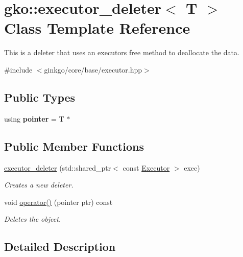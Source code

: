 \hypertarget{classgko_1_1executor__deleter}{}\section{gko\+:\+:executor\+\_\+deleter$<$ T $>$ Class Template Reference}
\label{classgko_1_1executor__deleter}


This is a deleter that uses an executor\textquotesingle{}s {\ttfamily free} method to deallocate the data.  




{\ttfamily \#include $<$ginkgo/core/base/executor.\+hpp$>$}

\subsection*{Public Types}
\begin{DoxyCompactItemize}
\item 
\mbox{\label{classgko_1_1executor__deleter_aeaea90789ef7502ffa1a4caa28561f50}} 
using {\bfseries pointer} = T $\ast$
\end{DoxyCompactItemize}
\subsection*{Public Member Functions}
\begin{DoxyCompactItemize}
\item 
\hyperlink{classgko_1_1executor__deleter_a260f79ed87560fefc48d52b072bbb776}{executor\+\_\+deleter} (std\+::shared\+\_\+ptr$<$ const \hyperlink{classgko_1_1Executor}{Executor} $>$ exec)
\begin{DoxyCompactList}\small\item\em Creates a new deleter. \end{DoxyCompactList}\item 
void \hyperlink{classgko_1_1executor__deleter_aaefa9d9f1c8ae4f4723668d5f946e5c0}{operator()} (pointer ptr) const
\begin{DoxyCompactList}\small\item\em Deletes the object. \end{DoxyCompactList}\end{DoxyCompactItemize}


\subsection{Detailed Description}
